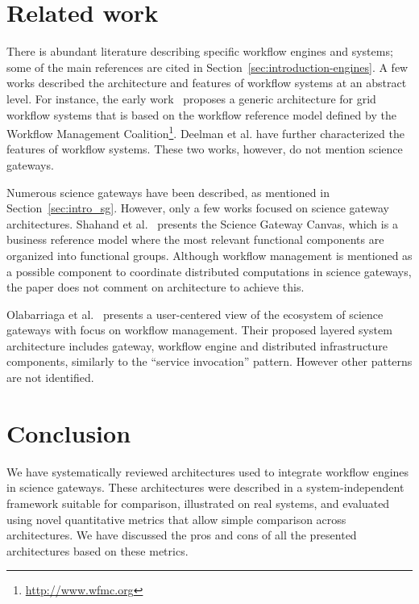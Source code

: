 \documentclass[preprint,3p,twocolumn]{elsarticle}
\begin{document}
\section{Related work}
\label{sec:related}
 
There is abundant literature describing specific workflow engines and
systems; some of the main references are cited in
Section~\ref{sec:introduction-engines}. A few works described the
architecture and features of workflow systems at an abstract level. For
instance, the early work~\cite{yuTaxonomy} proposes a generic
architecture for grid workflow systems that is based on the workflow
reference model defined by the Workflow Management
Coalition\footnote{\url{http://www.wfmc.org}}.  Deelman et
al. \cite{deelman2009workflows} have further characterized the
features of workflow systems. These two works, however, do not mention
science gateways.

Numerous science gateways have been described, as mentioned in
Section~\ref{sec:intro_sg}. However, only a few works focused on
science gateway architectures. Shahand et al.~\cite{shahand:2015ab}
presents the Science Gateway Canvas, which is a business reference
model where the most relevant functional components are organized into
functional groups. Although workflow management is mentioned as a
possible component to coordinate distributed computations in science
gateways, the paper does not comment on architecture to achieve this.

Olabarriaga et al.~\cite{olabarriaga2014} presents a user-centered
view of the ecosystem of science gateways with focus on workflow
management. Their proposed layered system architecture includes
gateway, workflow engine and distributed infrastructure components,
similarly to the ``service invocation'' pattern. However other patterns
are not identified.

\section{Conclusion}

We have systematically reviewed architectures used to integrate
workflow engines in science gateways. These architectures were
described in a system-independent framework suitable for comparison,
illustrated on real systems, and evaluated using novel quantitative
metrics that allow simple comparison across architectures. We have
discussed the pros and cons of all the presented architectures based
on these metrics.
\end{document}
